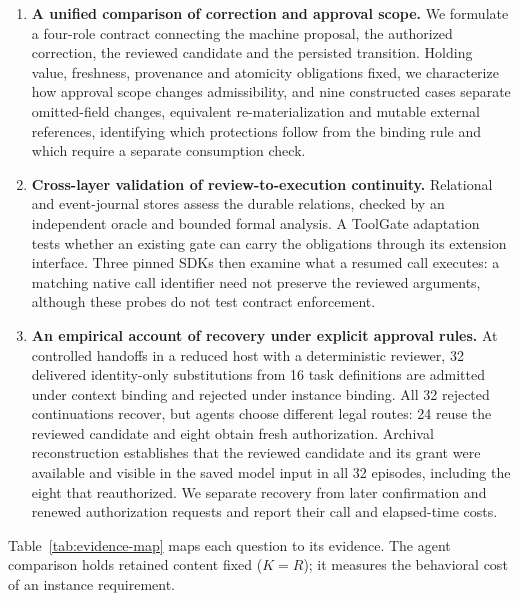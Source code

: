 \documentclass[pdflatex,sn-basic]{sn-jnl}
\begin{document}
\begin{enumerate}
\item \textbf{A unified comparison of correction and approval scope.} We formulate a four-role contract connecting the machine proposal, the authorized correction, the reviewed candidate and the persisted transition. Holding value, freshness, provenance and atomicity obligations fixed, we characterize how approval scope changes admissibility, and nine constructed cases separate omitted-field changes, equivalent re-materialization and mutable external references, identifying which protections follow from the binding rule and which require a separate consumption check.
\item \textbf{Cross-layer validation of review-to-execution continuity.} Relational and event-journal stores assess the durable relations, checked by an independent oracle and bounded formal analysis. A ToolGate adaptation tests whether an existing gate can carry the obligations through its extension interface. Three pinned SDKs then examine what a resumed call executes: a matching native call identifier need not preserve the reviewed arguments, although these probes do not test contract enforcement.
\item \textbf{An empirical account of recovery under explicit approval rules.} At controlled handoffs in a reduced host with a deterministic reviewer, 32 delivered identity-only substitutions from 16 task definitions are admitted under context binding and rejected under instance binding. All 32 rejected continuations recover, but agents choose different legal routes: 24 reuse the reviewed candidate and eight obtain fresh authorization. Archival reconstruction establishes that the reviewed candidate and its grant were available and visible in the saved model input in all 32 episodes, including the eight that reauthorized. We separate recovery from later confirmation and renewed authorization requests and report their call and elapsed-time costs.
\end{enumerate}

Table~\ref{tab:evidence-map} maps each question to its evidence. The agent comparison holds retained content fixed ($K=R$); it measures the behavioral cost of an instance requirement.
\end{document}
